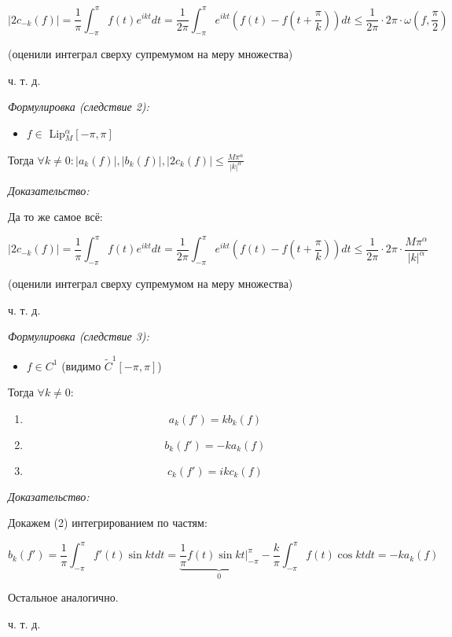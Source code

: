 \documentclass{article}
\begin{document}
\[|2c_{-k}(f)| = \frac{1}{\pi} \int_{-\pi}^{\pi} f(t) e^{ikt} dt = \frac{1}{2\pi} \int_{-\pi}^{\pi}e^{ikt}\left(f(t) - f(t + \frac{\pi}{k})\right) dt \le \frac{1}{2\pi} \cdot 2\pi \cdot \omega(f, \frac{\pi}{2})\]

(оценили интеграл сверху супремумом на меру множества)

ч. т. д. 

\textit{Формулировка (следствие 2):}

\begin{itemize}
    \item $f \in$ Lip$_M^\alpha[-\pi, \pi]$
\end{itemize}

Тогда $\forall k \neq 0: |a_k(f)|, |b_k(f)|, |2c_k(f)| \le \frac{M\pi^\alpha}{|k|^\alpha}$

\textit{Доказательство:}

Да то же самое всё:

\[|2c_{-k}(f)| = \frac{1}{\pi} \int_{-\pi}^{\pi} f(t) e^{ikt} dt = \frac{1}{2\pi} \int_{-\pi}^{\pi}e^{ikt}\left(f(t) - f(t + \frac{\pi}{k})\right) dt \le \frac{1}{2\pi} \cdot 2\pi \cdot \frac{M \pi^\alpha}{|k|^\alpha}\]

(оценили интеграл сверху супремумом на меру множества)

ч. т. д. 

\textit{Формулировка (следствие 3):}

\begin{itemize}
    \item $f \in C^1$ (видимо $\tilde{C}^1[-\pi, \pi]$)
\end{itemize}

Тогда $\forall k \neq 0$:

\begin{enumerate}
    \item \[a_k(f') = kb_k(f)\]
    \item \[b_k(f') = -ka_k(f)\]
    \item \[c_k(f') = ikc_k(f)\]
\end{enumerate}

\textit{Доказательство: }

Докажем (2) интегрированием по частям:

\[b_k(f') = \frac{1}{\pi}\int_{-\pi}^{\pi} f'(t) \sin kt dt = \underbrace{\frac{1}{\pi}f(t)\sin kt|_{-\pi}^{\pi}}_{0} - \frac{k}{\pi} \int_{-\pi}^{\pi} f(t) \cos kt dt = -ka_k(f) \]

Остальное аналогично.

ч. т. д. 
\end{document}
